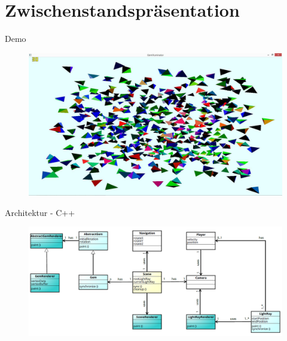 

\subtitle{Game Programming}



\slidetitle
\section*{Zwischenstandspräsentation}

\begin{frame}{Demo}
	\begin{figure}
		\centering
		\includegraphics[width=\textwidth, height=0.7\textheight, keepaspectratio]{images/500_gems_intel}
	\end{figure}
\end{frame}

\begin{frame}{Architektur - C++}
	\begin{figure}
		\centering
		\includegraphics[width=\textwidth, height=\textheight, keepaspectratio]{images/klassendiagramm}
	\end{figure}
\end{frame}


